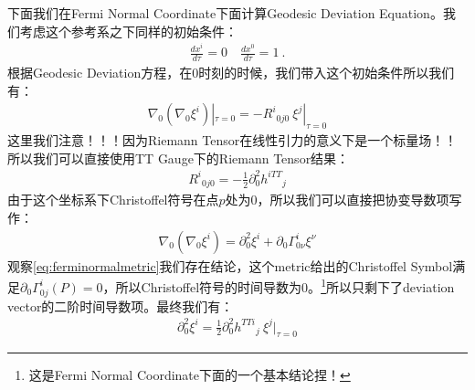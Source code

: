 下面我们在Fermi Normal Coordinate下面计算Geodesic Deviation Equation。我们考虑这个参考系之下同样的初始条件：
\begin{align}
  \frac{dx^i}{d\tau} = 0 \quad \frac{dx^0}{d\tau} = 1\mathrm{~.}
\end{align}
根据Geodesic Deviation方程，在0时刻的时候，我们带入这个初始条件所以我们有：
\begin{align}
  \nabla_{0}(\nabla_{0}\xi^{i})|_{\tau=0}=-R^{i}{}_{0j0} \ \xi^{j}|_{\tau=0}
\end{align}
这里我们注意！！！因为Riemann Tensor在线性引力的意义下是一个标量场！！所以我们可以直接使用TT Gauge下的Riemann Tensor结果：
\begin{align}
  R^{i}{}_{0j0}=-\frac{1}{2}\partial_{0}^{2}h^{iTT}{}_{j}
\end{align}
由于这个坐标系下Christoffel符号在点$ p $处为0，所以我们可以直接把协变导数项写作：
\begin{align}
  \nabla_{0}(\nabla_{0}\xi^{i}) =
  \partial_0^2\xi^i+\partial_0\Gamma_{0\nu}^i\xi^\nu
\end{align}
观察\cref{eq:ferminormalmetric}我们存在结论，这个metric给出的Christoffel Symbol满足$
\partial_0\Gamma_{0j}^i(P)=0
$，所以Christoffel符号的时间导数为0。\footnote{这是Fermi Normal
Coordinate下面的一个基本结论捏！}所以只剩下了deviation
vector的二阶时间导数项。最终我们有：
\begin{align}
  \partial_{0}^{2}\xi^{i} = \frac{1}{2}\partial_{0}^{2}h^{TTi}{}_{j}
  \ \xi^{j}|_{\tau=0}
\end{align}

\bigskip
{}

